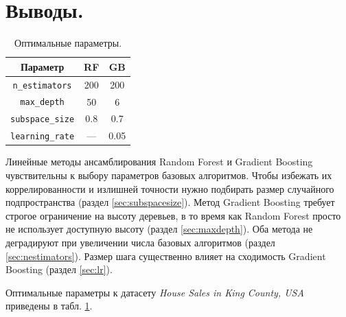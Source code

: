 \documentclass[12pt]{extarticle}
\begin{document}
\section{Выводы.}

\begin{table}
    \caption{Оптимальные параметры.}
    \label{tbl:summary}
    \begin{tabular}{c|c|c}
        Параметр & RF & GB \\
        \hline
        \texttt{n\_estimators} & 200 & 200 \\
        \texttt{max\_depth} & 50 & 6 \\
        \texttt{subspace\_size} & 0.8 & 0.7 \\
        \texttt{learning\_rate} & --- & 0.05\\
    \end{tabular}
\end{table} 

Линейные методы ансамблирования Random Forest и Gradient Boosting чувствительны к выбору параметров базовых алгоритмов. Чтобы избежать их коррелированности и излишней точности нужно подбирать размер случайного подпространства (раздел \ref{sec:subspacesize}). Метод Gradient Boosting требует строгое ограничение на высоту деревьев, в то время как Random Forest просто не использует доступную высоту (раздел \ref{sec:maxdepth}). Оба метода не деградируют при увеличении числа базовых алгоритмов (раздел \ref{sec:nestimators}). Размер шага существенно влияет на сходимость Gradient Boosting (раздел \ref{sec:lr}).

Оптимальные параметры к датасету \textit{House Sales in King County, USA} приведены в табл. \ref{tbl:summary}.

\printbibliography
\end{document}

